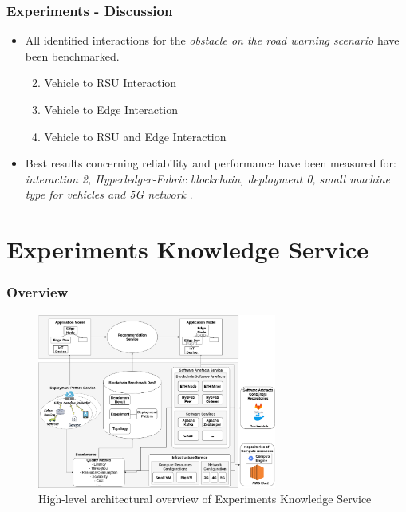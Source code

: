 \documentclass{beamer}
\begin{document}
		\begin{frame}
			\frametitle{Experiments - Discussion}
			\begin{itemize}
			\item All identified interactions for the \textit{obstacle on the road warning scenario} have been benchmarked.
				\begin{enumerate}
					\setcounter{enumi}{1}
					\item Vehicle to \gls{RSU} Interaction
					\item Vehicle to Edge Interaction
					\item Vehicle to \gls{RSU} and Edge Interaction
				\end{enumerate}
			\item Best results concerning reliability and performance have been measured for: \textit{interaction 2, Hyperledger-Fabric blockchain, deployment 0, small machine type for vehicles and 5G network }.
			\end{itemize}
		\end{frame}
	
	
	\section{Experiments Knowledge Service}
	
	\begin{frame}
		\frametitle{Overview}
		\begin{figure}[h]
			\centering
			\includegraphics[width=0.7\textwidth]{figures/knowledge_service_high_level_architecture.png}
			\caption{High-level architectural overview of Experiments Knowledge Service}
			\label{fig:experiments_knowledge_service_overview}
		\end{figure}
		
	\end{frame}
	
\end{document}
